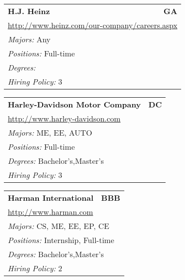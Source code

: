 \documentclass[twoside]{article}
\begin{document}
\begin{center}
\begin{multicols}{3}
\begin{FlushLeft}
\begin{minipage}{.9\columnwidth}
\end{minipage}
 
\begin{minipage}{.9\columnwidth}\begin{tabularx}{.95\columnwidth}{Xr}
                 {\Large\bf H.J. Heinz} & {\Large\bf GA}\\
    \multicolumn{2}{p{.95\columnwidth}}{\url{http://www.heinz.com/our-company/careers.aspx}}\\
    \multicolumn{2}{p{.95\columnwidth}}{\emph{Majors:} Any}\\
    \multicolumn{2}{p{.95\columnwidth}}{\emph{Positions:} Full-time}\\
    \multicolumn{2}{p{.95\columnwidth}}{\emph{Degrees:} }\\
    \multicolumn{2}{p{.95\columnwidth}}{\emph{Hiring Policy:} 3}\\
    \end{tabularx}
    
\end{minipage}
 
\begin{minipage}{.9\columnwidth}\begin{tabularx}{.95\columnwidth}{Xr}
                 {\Large\bf Harley-Davidson Motor Company} & {\Large\bf DC}\\
    \multicolumn{2}{p{.95\columnwidth}}{\url{http://www.harley-davidson.com}}\\
    \multicolumn{2}{p{.95\columnwidth}}{\emph{Majors:} ME, EE, AUTO}\\
    \multicolumn{2}{p{.95\columnwidth}}{\emph{Positions:} Full-time}\\
    \multicolumn{2}{p{.95\columnwidth}}{\emph{Degrees:} Bachelor's,Master's}\\
    \multicolumn{2}{p{.95\columnwidth}}{\emph{Hiring Policy:} 3}\\
    \end{tabularx}
    
\end{minipage}
 
\begin{minipage}{.9\columnwidth}\begin{tabularx}{.95\columnwidth}{Xr}
                 {\Large\bf Harman International} & {\Large\bf BBB}\\
    \multicolumn{2}{p{.95\columnwidth}}{\url{http://www.harman.com}}\\
    \multicolumn{2}{p{.95\columnwidth}}{\emph{Majors:} CS, ME, EE, EP, CE}\\
    \multicolumn{2}{p{.95\columnwidth}}{\emph{Positions:} Internship, Full-time}\\
    \multicolumn{2}{p{.95\columnwidth}}{\emph{Degrees:} Bachelor's,Master's}\\
    \multicolumn{2}{p{.95\columnwidth}}{\emph{Hiring Policy:} 2}\\
    \end{tabularx}
    

\end{minipage}
\end{FlushLeft}
\end{multicols}
\end{center}
\end{document}
